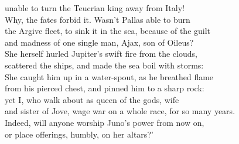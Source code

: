 \documentclass[10pt, a5paper, titlepage]{minimal}
\begin{document}
unable to turn the Teucrian king away from Italy!\\
Why, the fates forbid it. Wasn't Pallas able to burn\\
the Argive fleet, to sink it in the sea, because of the guilt\\
and madness of one single man, Ajax, son of Oileus?\\
She herself hurled Jupiter's swift fire from the clouds,\\
scattered the ships, and made the sea boil with storms:\\
She caught him up in a water-spout, as he breathed flame\\
from his pierced chest, and pinned him to a sharp rock:\\
yet I, who walk about as queen of the gods, wife\\
and sister of Jove, wage war on a whole race, for so many years.\\
Indeed, will anyone worship Juno's power from now on,\\
or place offerings, humbly, on her altars?'
\end{document}
